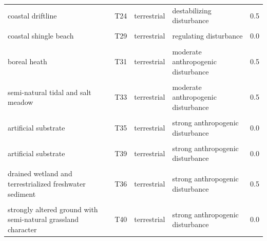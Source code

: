 \documentclass[
]{article}
\begin{document}
\begin{landscape}
\begin{longtable}[t]{llllr}
coastal driftline & T24 & terrestrial & destabilizing disturbance & 0.5\\
\cellcolor{gray!6}{boulder field} & \cellcolor{gray!6}{T27} & \cellcolor{gray!6}{terrestrial} & \cellcolor{gray!6}{regulating disturbance} & \cellcolor{gray!6}{0.0}\\
coastal shingle beach & T29 & terrestrial & regulating disturbance & 0.0\\
\cellcolor{gray!6}{alluvial forest} & \cellcolor{gray!6}{T30} & \cellcolor{gray!6}{terrestrial} & \cellcolor{gray!6}{destabilizing disturbance} & \cellcolor{gray!6}{10.0}\\
\addlinespace
boreal heath & T31 & terrestrial & moderate anthropogenic disturbance & 0.5\\
\cellcolor{gray!6}{semi-natural grassland} & \cellcolor{gray!6}{T32} & \cellcolor{gray!6}{terrestrial} & \cellcolor{gray!6}{moderate anthropogenic disturbance} & \cellcolor{gray!6}{0.5}\\
semi-natural tidal and salt meadow & T33 & terrestrial & moderate anthropogenic disturbance & 0.5\\
\cellcolor{gray!6}{coastal heath} & \cellcolor{gray!6}{T34} & \cellcolor{gray!6}{terrestrial} & \cellcolor{gray!6}{moderate anthropogenic disturbance} & \cellcolor{gray!6}{0.5}\\
artificial substrate & T35 & terrestrial & strong anthropogenic disturbance & 0.0\\
\addlinespace
\cellcolor{gray!6}{artificial substrate} & \cellcolor{gray!6}{T37} & \cellcolor{gray!6}{terrestrial} & \cellcolor{gray!6}{strong anthropogenic disturbance} & \cellcolor{gray!6}{0.0}\\
artificial substrate & T39 & terrestrial & strong anthropogenic disturbance & 0.0\\
\cellcolor{gray!6}{artificial substrate} & \cellcolor{gray!6}{T43} & \cellcolor{gray!6}{terrestrial} & \cellcolor{gray!6}{strong anthropogenic disturbance} & \cellcolor{gray!6}{0.0}\\
drained wetland and terrestrialized freshwater sediment & T36 & terrestrial & strong anthropogenic disturbance & 0.5\\
\cellcolor{gray!6}{tree plantation} & \cellcolor{gray!6}{T38} & \cellcolor{gray!6}{terrestrial} & \cellcolor{gray!6}{strong anthropogenic disturbance} & \cellcolor{gray!6}{10.0}\\
\addlinespace
strongly altered ground with semi-natural grassland character & T40 & terrestrial & strong anthropogenic disturbance & 0.0\\

\end{longtable}
\end{landscape}
\end{document}
